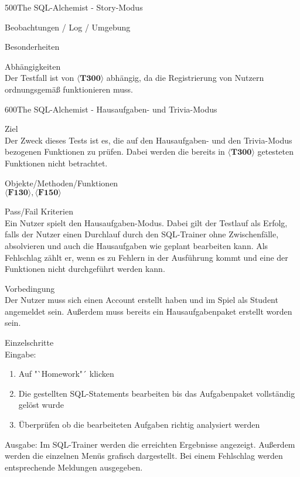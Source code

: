 \begin{testcase}{500}{The SQL-Alchemist - Story-Modus}
\item[Beobachtungen / Log / Umgebung]~\\

\item[Besonderheiten]~\\

\item[Abhängigkeiten]~\\
Der Testfall ist von $\langle\textbf{T300}\rangle$ abhängig, da die Registrierung von Nutzern ordnungsgemäß funktionieren muss.

\end{testcase}

\begin{testcase}{600}{The SQL-Alchemist - Hausaufgaben- und Trivia-Modus}

\item[Ziel]~\\
Der Zweck dieses Tests ist es, die auf den Hausaufgaben- und den Trivia-Modus bezogenen Funktionen zu prüfen. Dabei werden die bereits in $\langle\textbf{T300}\rangle$ getesteten Funktionen nicht betrachtet.

\item[Objekte/Methoden/Funktionen]~\\
$\langle\textbf{F130}\rangle, \langle\textbf{F150}\rangle$ 

\item[Pass/Fail Kriterien]~\\
Ein Nutzer spielt den Hausaufgaben-Modus. Dabei gilt der Testlauf als Erfolg, falls der Nutzer einen Durchlauf durch den SQL-Trainer  ohne Zwischenfälle, absolvieren und auch die Hausaufgaben wie geplant bearbeiten kann. Als Fehlschlag zählt er, wenn es zu Fehlern in der Ausführung kommt und eine der Funktionen nicht durchgeführt werden kann. 

\item[Vorbedingung]~\\
Der Nutzer muss sich einen Account erstellt haben und im Spiel als Student angemeldet sein. Außerdem muss bereits ein Hausaufgabenpaket erstellt worden sein.

\item[Einzelschritte]~\\

Eingabe:
\begin{enumerate}
\item Auf "`Homework"´ klicken
\item Die gestellten SQL-Statements bearbeiten bis das Aufgabenpaket vollständig gelöst wurde
\item Überprüfen ob die bearbeiteten Aufgaben richtig analysiert werden
\end{enumerate}
Ausgabe:
Im SQL-Trainer werden die erreichten Ergebnisse angezeigt. Außerdem werden die einzelnen Menüs grafisch dargestellt. Bei einem Fehlschlag werden entsprechende Meldungen ausgegeben.


\end{testcase}
